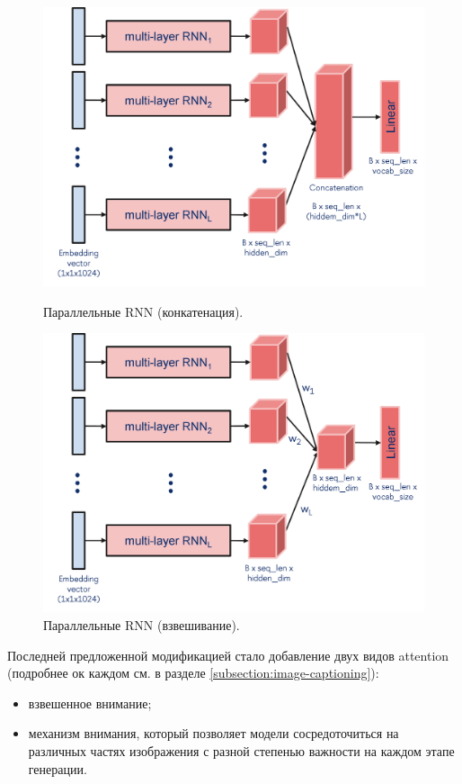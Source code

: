 \documentclass[a4paper,12pt]{extarticle}
\begin{document}
\begin{figure}[ht]
\begin{minipage}[b]{3in}
	\includegraphics[scale=0.5]{rnn-parallel-concatenation.png}
	\caption{Параллельные RNN (конкатенация).}
	\label{fig:rnn-parallel-concatenation}
\end{minipage}
\hfill
\begin{minipage}[b]{3in}
	\includegraphics[scale=0.5]{rnn-parallel-weighted.png}
	\caption{Параллельные RNN (взвешивание).}
	\label{fig:rnn-parallel-weighted}
\end{minipage}
\end{figure}
Последней предложенной модификацией стало добавление двух видов attention (подробнее ок каждом см. в разделе \ref{subsection:image-captioning}):
\begin{itemize}
	\item взвешенное внимание;
	\item механизм внимания, который позволяет модели сосредоточиться на различных частях изображения с разной степенью важности на каждом этапе генерации.
\end{itemize}
\end{document}
